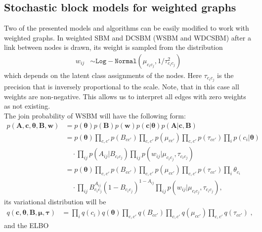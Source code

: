 \documentclass{article}
\renewcommand{\v}[1]{\bm{#1}}
\begin{document}
\subsection{Stochastic block models for weighted graphs}
Two of the presented models and algorithms can be easily modified to work with weighted graphs. In weighted SBM and DCSBM (WSBM and WDCSBM) after a link between nodes is drawn, its weight is sampled from the distribution
\begin{align*}
w_{ij} &\sim \mathtt{Log-Normal}(\mu_{c_i c_j}, 1/\tau_{c_i c_j}^2)
\end{align*}
which depends on the latent class assignments of the nodes. Here $\tau_{c_i c_j}$ is the precision that is inversely proportional to the scale. Note, that in this case all weights are non-negative. This allows us to interpret all edges with zero weights as not existing.\\

The join probability of WSBM will have the following form:
\begin{equation}
\begin{split}
p(\v{A}, \v{c}, \v{\theta}, \v{B}, \v{w})
&= p(\v{\theta}) p(\v{B}) p(\v{w}) p( \v{c} | \v{\theta} ) p( \v{A} | \v{c}, \v{B} ) \\
&= p(\v{\theta}) \prod_{c,c'} p(B_{c c'}) \prod_{c,c'} p(\mu_{c c'}) \prod_{c,c'} p(\tau_{c c'}) \prod_i p(c_i | \v{\theta})\\
& \quad \cdot  \prod_{ij} p(A_{ij} | B_{c_i c_j}) \prod_{ij} p(w_{ij} | \mu_{c_i c_j}, \tau_{c_i c_j})\\
&= p(\v{\theta}) \prod_{c,c'} p(B_{c c'}) \prod_{c,c'} p(\mu_{c c'}) \prod_{c,c'} p(\tau_{c c'}) \prod_i \theta_{c_i}\\
& \quad \cdot \prod_{ij} B_{c_i c_j}^{A_{ij}} (1 - B_{c_i c_j})^{1 - {A_{ij}}} \prod_{ij} p(w_{ij} | \mu_{c_i c_j}, \tau_{c_i c_j}),
\end{split}
\end{equation}
its variational distribution will be
\begin{equation}
\begin{split}
q(\v{c}, \v{\theta}, \v{B}, \v{\mu}, \v{\tau})
&= \prod_i q(c_i) q(\v{\theta}) \prod_{c,c'} q(B_{cc'}) \prod_{c,c'} q(\mu_{cc'}) \prod_{c,c'} q(\tau_{cc'})\; ,
\end{split}
\end{equation}
and the ELBO
\end{document}
